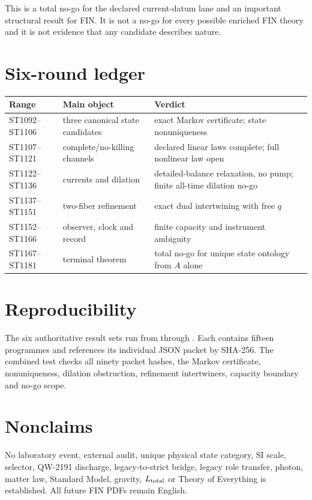 \documentclass[11pt,a4paper]{article}
\begin{document}
This is a total no-go for the declared current-datum lane and an important
structural result for FIN.  It is not a no-go for every possible enriched FIN
theory and it is not evidence that any candidate describes nature.

\appendix
\section{Six-round ledger}
\begin{longtable}{@{}p{}p{}p{}@{}}
\toprule
Range & Main object & Verdict \\
\midrule\endhead
ST1092--ST1106 & three canonical state candidates & exact Markov certificate; state nonuniqueness \\
ST1107--ST1121 & complete/no-killing channels & declared linear laws complete; full nonlinear law open \\
ST1122--ST1136 & currents and dilation & detailed-balance relaxation, no pump; finite all-time dilation no-go \\
ST1137--ST1151 & two-fiber refinement & exact dual intertwining with free $q$ \\
ST1152--ST1166 & observer, clock and record & finite capacity and instrument ambiguity \\
ST1167--ST1181 & terminal theorem & total no-go for unique state ontology from $A$ alone \\
\bottomrule
\end{longtable}

\section{Reproducibility}

The six authoritative result sets run from
 through
.  Each contains fifteen programmes and
references its individual JSON packet by SHA-256.  The combined test
 checks all ninety packet hashes, the Markov
certificate, nonuniqueness, dilation obstruction, refinement intertwiners,
capacity boundary and no-go scope.

\section{Nonclaims}

No laboratory event, external audit, unique physical state category, SI scale,
selector, QW-2191 discharge, legacy-to-strict bridge, legacy role transfer,
photon, matter law, Standard Model, gravity, $L_{\rm total}$ or Theory of
Everything is established.  All future FIN PDFs remain English.
\end{document}
